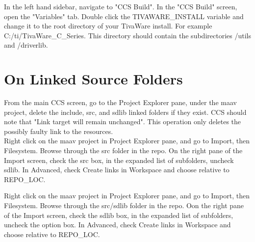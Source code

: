 \documentclass[]{article}
\begin{document}
In the left hand sidebar, navigate to "CCS Build". In the "CCS Build" screen, open the "Variables" tab. Double click the TIVAWARE\_INSTALL variable and change it to the root directory of your TivaWare install. For example C:/ti/TivaWare\_C\_Series. This directory should contain the subdirectories /utils and /driverlib. 

\section{On Linked Source Folders}

From the main CCS screen, go to the Project Explorer pane, under the maav project, delete the include, src, and sdlib linked folders if they exist. CCS should note that "Link target will remain unchanged". This operation only deletes the possibly faulty link to the resources. \\

Right click on the maav project in Project Explorer pane, and go to Import, then Filesystem. Browse through the src folder in the repo. On the right pane of the Import screen, check the src box, in the expanded list of subfolders, uncheck sdlib. In Advanced, check Create links in Workspace and choose relative to REPO\_LOC.

Right click on the maav project in Project Explorer pane, and go to Import, then Filesystem. Browse through the src/sdlib folder in the repo. Oon the right pane of the Import screen, check the sdlib box, in the expanded list of subfolders, uncheck the option box. In Advanced, check Create links in Workspace and choose relative to REPO\_LOC.
\end{document}
